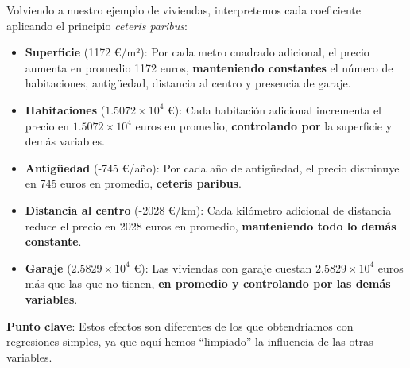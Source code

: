 \documentclass[
  letterpaper,
  DIV=11,
  numbers=noendperiod]{scrreprt}
\begin{document}
\begin{tcolorbox}[enhanced jigsaw, breakable, toprule=.15mm, bottomtitle=1mm, coltitle=black, colbacktitle=quarto-callout-tip-color!10!white, titlerule=0mm, opacitybacktitle=0.6, bottomrule=.15mm, toptitle=1mm, title=\textcolor{quarto-callout-tip-color}{\faLightbulb}\hspace{0.5em}{Interpretación práctica de los coeficientes}, arc=.35mm, rightrule=.15mm, opacityback=0, colframe=quarto-callout-tip-color-frame, leftrule=.75mm, left=2mm, colback=white]

Volviendo a nuestro ejemplo de viviendas, interpretemos cada coeficiente
aplicando el principio \emph{ceteris paribus}:

\begin{itemize}
\item
  \textbf{Superficie} (1172 €/m²): Por cada metro cuadrado adicional, el
  precio aumenta en promedio 1172 euros, \textbf{manteniendo constantes}
  el número de habitaciones, antigüedad, distancia al centro y presencia
  de garaje.
\item
  \textbf{Habitaciones} (\ensuremath{1.5072\times 10^{4}} €): Cada
  habitación adicional incrementa el precio en
  \ensuremath{1.5072\times 10^{4}} euros en promedio,
  \textbf{controlando por} la superficie y demás variables.
\item
  \textbf{Antigüedad} (-745 €/año): Por cada año de antigüedad, el
  precio disminuye en 745 euros en promedio, \textbf{ceteris paribus}.
\item
  \textbf{Distancia al centro} (-2028 €/km): Cada kilómetro adicional de
  distancia reduce el precio en 2028 euros en promedio,
  \textbf{manteniendo todo lo demás constante}.
\item
  \textbf{Garaje} (\ensuremath{2.5829\times 10^{4}} €): Las viviendas
  con garaje cuestan \ensuremath{2.5829\times 10^{4}} euros más que las
  que no tienen, \textbf{en promedio y controlando por las demás
  variables}.
\end{itemize}

\textbf{Punto clave}: Estos efectos son diferentes de los que
obtendríamos con regresiones simples, ya que aquí hemos ``limpiado'' la
influencia de las otras variables.

\end{tcolorbox}
\end{document}
